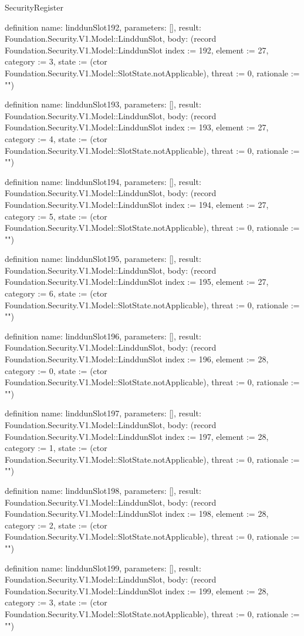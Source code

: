 \begin{lexlean}{SecurityRegister}
\begin{semanticmodule}
definition{
  name: linddunSlot192,
  parameters: [],
  result: Foundation.Security.V1.Model::LinddunSlot,
  body: (record Foundation.Security.V1.Model::LinddunSlot {index := 192, element := 27, category := 3, state := (ctor Foundation.Security.V1.Model::SlotState.notApplicable), threat := 0, rationale := ""})
}

definition{
  name: linddunSlot193,
  parameters: [],
  result: Foundation.Security.V1.Model::LinddunSlot,
  body: (record Foundation.Security.V1.Model::LinddunSlot {index := 193, element := 27, category := 4, state := (ctor Foundation.Security.V1.Model::SlotState.notApplicable), threat := 0, rationale := ""})
}

definition{
  name: linddunSlot194,
  parameters: [],
  result: Foundation.Security.V1.Model::LinddunSlot,
  body: (record Foundation.Security.V1.Model::LinddunSlot {index := 194, element := 27, category := 5, state := (ctor Foundation.Security.V1.Model::SlotState.notApplicable), threat := 0, rationale := ""})
}

definition{
  name: linddunSlot195,
  parameters: [],
  result: Foundation.Security.V1.Model::LinddunSlot,
  body: (record Foundation.Security.V1.Model::LinddunSlot {index := 195, element := 27, category := 6, state := (ctor Foundation.Security.V1.Model::SlotState.notApplicable), threat := 0, rationale := ""})
}

definition{
  name: linddunSlot196,
  parameters: [],
  result: Foundation.Security.V1.Model::LinddunSlot,
  body: (record Foundation.Security.V1.Model::LinddunSlot {index := 196, element := 28, category := 0, state := (ctor Foundation.Security.V1.Model::SlotState.notApplicable), threat := 0, rationale := ""})
}

definition{
  name: linddunSlot197,
  parameters: [],
  result: Foundation.Security.V1.Model::LinddunSlot,
  body: (record Foundation.Security.V1.Model::LinddunSlot {index := 197, element := 28, category := 1, state := (ctor Foundation.Security.V1.Model::SlotState.notApplicable), threat := 0, rationale := ""})
}

definition{
  name: linddunSlot198,
  parameters: [],
  result: Foundation.Security.V1.Model::LinddunSlot,
  body: (record Foundation.Security.V1.Model::LinddunSlot {index := 198, element := 28, category := 2, state := (ctor Foundation.Security.V1.Model::SlotState.notApplicable), threat := 0, rationale := ""})
}

definition{
  name: linddunSlot199,
  parameters: [],
  result: Foundation.Security.V1.Model::LinddunSlot,
  body: (record Foundation.Security.V1.Model::LinddunSlot {index := 199, element := 28, category := 3, state := (ctor Foundation.Security.V1.Model::SlotState.notApplicable), threat := 0, rationale := ""})
}


\end{semanticmodule}
\end{lexlean}
